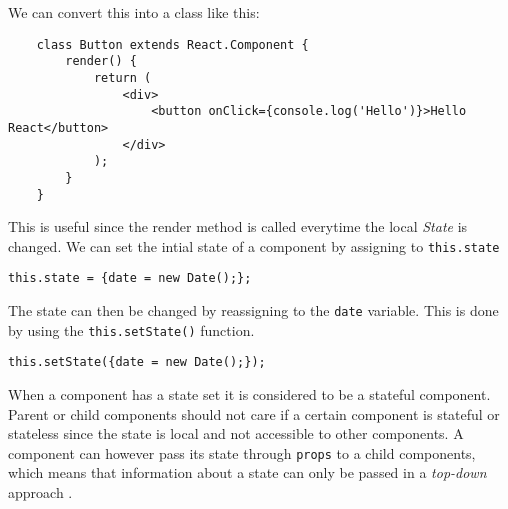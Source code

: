 We can convert this into a class like this:
\begin{lstlisting}
    class Button extends React.Component {
        render() {
            return (
                <div>
                    <button onClick={console.log('Hello')}>Hello React</button>
                </div>
            );
        }
    }
\end{lstlisting}
This is useful since the render method is called everytime the local \textit{State} is changed. We can set the intial state of a component by assigning to \texttt{this.state}
\begin{center}
    \texttt{this.state = \{date = new Date();\};}
\end{center}
The state can then be changed by reassigning to the \texttt{date} variable. This is done by using the \texttt{this.setState()} function.
\begin{center}
    \texttt{this.setState(\{date = new Date();\});}
\end{center}
When a component has a state set it is considered to be a stateful component. 
Parent or child components should not care if a certain component is stateful or stateless since the state is local and not accessible to other components. 
A component can however pass its state through \texttt{props} to a child components, which means that information about a state can only be passed in a \textit{top-down} approach \cite{ReactJS}.
